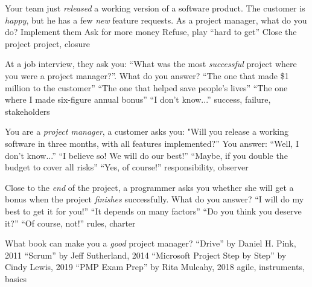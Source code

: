 \documentclass{article}
\begin{document}

\pmbaQuestion
  {Your team just \emph{released} a working version of a software product. The customer is \emph{happy}, but he has a few \emph{new} feature requests. As a project manager, what do you do?}
  {Implement them}
  {Ask for more money}
  {Refuse, play ``hard to get''}
  {Close the project}
  {project, closure}

\pmbaQuestion
  {At a job interview, they ask you: ``What was the most \emph{successful} project where you were a project manager?''. What do you answer?}
  {``The one that made \$1 million to the customer''}
  {``The one that helped save people's lives''}
  {``The one where I made six-figure annual bonus''}
  {``I don't know...''}
  {success, failure, stakeholders}

\pmbaQuestion
  {You are a \emph{project manager}, a customer asks you: "Will you release a working software in three months, with all features implemented?'' You answer:}
  {``Well, I don't know...''}
  {``I believe so! We will do our best!''}
  {``Maybe, if you double the budget to cover all risks''}
  {``Yes, of course!''}
  {responsibility, observer}

\pmbaQuestion
  {Close to the \emph{end} of the project, a programmer asks you whether she will get a bonus when the project \emph{finishes} successfully. What do you answer?}
  {``I will do my best to get it for you!''}
  {``It depends on many factors''}
  {``Do you think you deserve it?''}
  {``Of course, not!''}
  {rules, charter}

\pmbaQuestion
  {What book can make you a \emph{good} project manager?}
  {``Drive'' by Daniel H. Pink, 2011}
  {``Scrum'' by Jeff Sutherland, 2014}
  {``Microsoft Project Step by Step'' by Cindy Lewis, 2019}
  {``PMP Exam Prep'' by Rita Mulcahy, 2018}
  {agile, instruments, basics}

\end{document}
